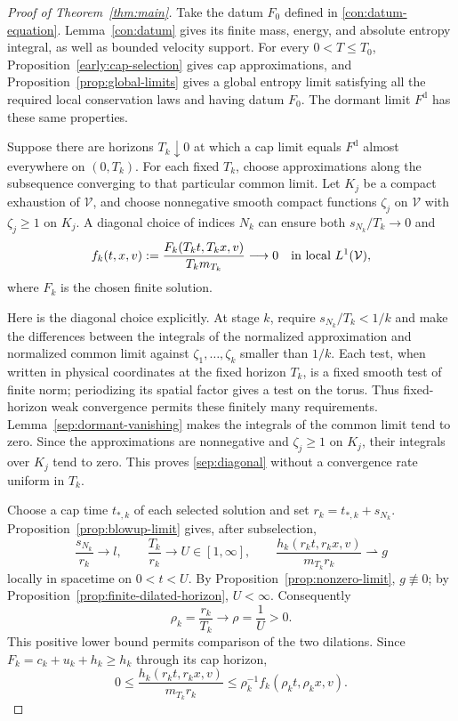 \begin{proof}[Proof of Theorem~\ref{thm:main}]
Take the datum \(F_0\) defined in \eqref{con:datum-equation}.
Lemma~\ref{con:datum} gives its finite mass, energy, and absolute
entropy integral, as well as bounded velocity support. For every
\(0<T\le T_0\), Proposition~\ref{early:cap-selection} gives cap
approximations, and Proposition~\ref{prop:global-limits} gives a global
entropy limit satisfying all the required local conservation laws and
having datum \(F_0\). The dormant limit \(F^{\mathrm d}\) has these
same properties.

Suppose there are horizons \(T_k\downarrow0\) at which a cap limit
equals \(F^{\mathrm d}\) almost everywhere on \((0,T_k)\).
For each fixed \(T_k\), choose approximations along the subsequence
converging to that particular common limit. Let \(K_j\) be a compact
exhaustion of \(\mathcal V\), and choose nonnegative smooth compact
functions \(\zeta_j\) on \(\mathcal V\) with
\(\zeta_j\ge1\) on \(K_j\). A diagonal choice of indices \(N_k\)
can ensure both \(s_{N_k}/T_k\to0\) and
\begin{equation}\label{sep:diagonal}
 f_k(t,x,v):=\frac{F_k(T_kt,T_kx,v)}{T_km_{T_k}}
       \longrightarrow0
       \quad\hbox{in local }L^1(\mathcal V),
\end{equation}
where \(F_k\) is the chosen finite solution.

Here is the diagonal choice explicitly. At stage \(k\), require
\(s_{N_k}/T_k<1/k\) and make the differences between the integrals
of the normalized approximation and normalized common limit against
\(\zeta_1,\ldots,\zeta_k\) smaller than \(1/k\). Each test, when
written in physical coordinates at the fixed horizon \(T_k\), is
a fixed smooth test of finite norm; periodizing its spatial factor
gives a test on the torus. Thus fixed-horizon weak convergence permits
these finitely many requirements. Lemma~\ref{sep:dormant-vanishing}
makes the integrals of the common limit tend to zero. Since the
approximations are nonnegative and \(\zeta_j\ge1\) on \(K_j\),
their integrals over \(K_j\) tend to zero. This proves
\eqref{sep:diagonal} without a convergence rate uniform in \(T_k\).

Choose a cap time \(t_{*,k}\) of each selected solution and set
\(r_k=t_{*,k}+s_{N_k}\). Proposition~\ref{prop:blowup-limit} gives,
after subselection,
\[
 \frac{s_{N_k}}{r_k}\to l,\qquad
 \frac{T_k}{r_k}\to U\in[1,\infty],\qquad
 \frac{h_k(r_kt,r_kx,v)}{m_{T_k}r_k}\rightharpoonup g
\]
locally in spacetime on \(0<t<U\). By
Proposition~\ref{prop:nonzero-limit}, \(g\not\equiv0\); by
Proposition~\ref{prop:finite-dilated-horizon}, \(U<\infty\).
Consequently
\[
 \rho_k=\frac{r_k}{T_k}\longrightarrow\rho=\frac1U>0.
\]
This positive lower bound permits comparison of the two dilations.
Since \(F_k=c_k+u_k+h_k\ge h_k\) through its cap horizon,
\begin{equation}\label{sep:scale-comparison}
 0\le\frac{h_k(r_kt,r_kx,v)}{m_{T_k}r_k}
       \le\rho_k^{-1}f_k(\rho_kt,\rho_kx,v).
\end{equation}


\end{proof}
